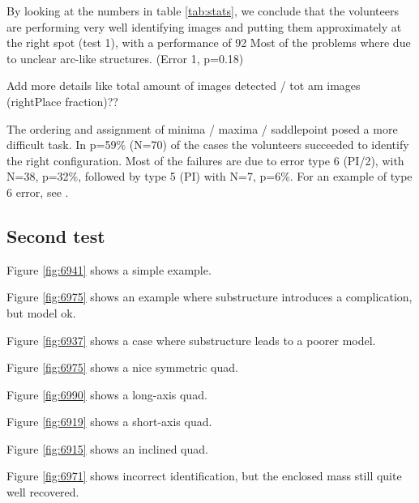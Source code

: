 

By looking at the numbers in table \ref{tab:stats}, we conclude that the volunteers are performing very well identifying images and putting them approximately at the right spot (test 1), with a performance of 92%
Most of the problems where due to unclear arc-like structures. (Error 1, p=0.18)

 Add more details like total amount of images detected / tot am images (rightPlace fraction)??

The ordering and assignment of minima / maxima / saddlepoint posed a more difficult task.
In p=59\% (N=70) of the cases the volunteers succeeded to identify the right configuration.
Most of the failures are due to error type 6 (PI/2), with N=38, p=32\%, followed by type 5 (PI) with N=7, p=6\%.
For an example of type 6 error, see .










\subsection{Second test} \label{sec:results.2}

Figure \ref{fig:6941} shows a simple example.

Figure \ref{fig:6975} shows an example where substructure introduces a
complication, but model ok.

Figure \ref{fig:6937} shows a case where substructure leads to a
poorer model.

Figure \ref{fig:6975} shows a nice symmetric quad.

Figure \ref{fig:6990} shows a long-axis quad.

Figure \ref{fig:6919} shows a short-axis quad.

Figure \ref{fig:6915} shows an inclined quad.

Figure \ref{fig:6971} shows incorrect identification, but the enclosed
mass still quite well recovered.


\clearpage
